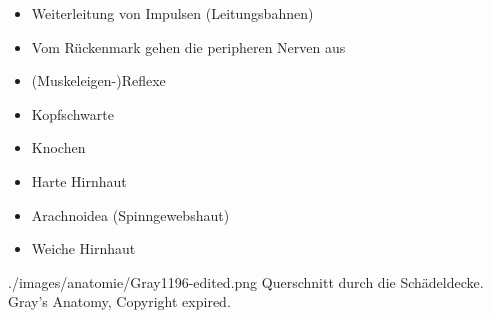 \begin{itemize}
    \item Weiterleitung von Impulsen (Leitungsbahnen)
    \item Vom Rückenmark gehen die peripheren Nerven aus
    \item (Muskeleigen-)Reflexe
\end{itemize}


{
\begin{itemize}
    \item Kopfschwarte
    \item Knochen
    \item Harte Hirnhaut 
    \item Arachnoidea (Spinngewebshaut)
    \item Weiche Hirnhaut 
\end{itemize}
}{}
{./images/anatomie/Gray1196-edited.png}
{Querschnitt durch
die Schädeldecke. }
{Gray's Anatomy, Copyright expired.}


